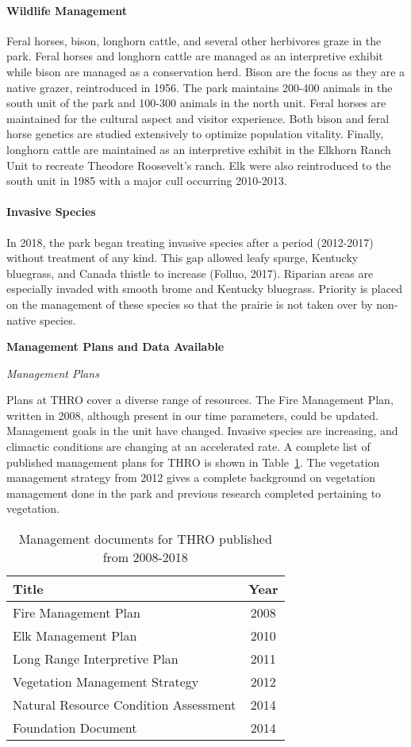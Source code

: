 \paragraph{Wildlife Management} 
Feral horses, bison, longhorn cattle, and several other herbivores graze in the park.
Feral horses and longhorn cattle are managed as an interpretive exhibit while bison are managed as a conservation herd. 
Bison are the focus as they are a native grazer, reintroduced in 1956. 
The park maintains 200-400 animals in the south unit of the park and 100-300 animals in the north unit. 
Feral horses are maintained for the cultural aspect and visitor experience. 
Both bison and feral horse genetics are studied extensively to optimize population vitality. 
Finally, longhorn cattle are maintained as an interpretive exhibit in the Elkhorn Ranch Unit to recreate Theodore Roosevelt's ranch. 
Elk were also reintroduced to the south unit in 1985 with a major cull occurring 2010-2013.

\paragraph{Invasive Species} 
In 2018, the park began treating invasive species after a period (2012-2017) without treatment of any kind. 
This gap allowed leafy spurge, Kentucky bluegrass, and Canada thistle to increase (Folluo, 2017). 
Riparian areas are especially invaded with smooth brome and Kentucky bluegrass. 
Priority is placed on the management of these species so that the prairie is not taken over by non-native species.

\textbf{Management Plans and Data Available}

\emph{Management Plans}

Plans at THRO cover a diverse range of resources. 
The Fire Management Plan, written in 2008, although present in our time parameters, could be updated. 
Management goals in the unit have changed. 
Invasive species are increasing, and climactic conditions are changing at an accelerated rate. 
A complete list of published management plans for THRO is shown in Table~\ref{tab:THROmandocs}. 
The vegetation management strategy from 2012 gives a complete background on vegetation management done in the park and previous research completed pertaining to vegetation.

\begin{table}[h]
	\centering
\caption[THRO management documents]
	{Management documents for THRO published from 2008-2018}
\label{tab:THROmandocs}
\begin{tabular}{lc}
	\toprule
	Title & Year\tabularnewline
	\midrule
	Fire Management Plan & 2008 \tabularnewline
	Elk Management Plan  & 2010 \tabularnewline
	Long Range Interpretive Plan & 2011 \tabularnewline
	Vegetation Management Strategy & 2012 \tabularnewline
	Natural Resource Condition Assessment & 2014\tabularnewline
	Foundation Document & 2014 \tabularnewline
	\bottomrule
\end{tabular}
\end{table}

